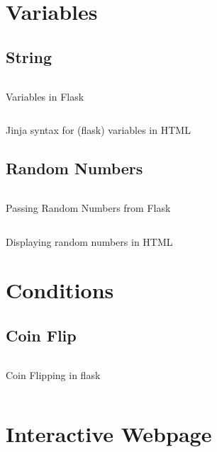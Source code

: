 \section{Variables}
\subsection{String}
\begin{code}
	\inputminted{python}{codes/web/flask/hello2/application.py}
	\caption{Variables in Flask}
\end{code}
\begin{code}
	\inputminted{html}{codes/web/flask/hello2/templates/index.html}
	\caption{Jinja syntax for (flask) variables in HTML}
\end{code}

\subsection{Random Numbers}
\begin{code}
	\inputminted{python}{codes/web/flask/random/application.py}
	\caption{Passing Random Numbers from Flask}
\end{code}
\clearpage
\begin{code}
	\inputminted{html}{codes/web/flask/random/templates/index.html}
	\caption{Displaying random numbers in HTML}
\end{code}

\section{Conditions}
\subsection{Coin Flip}
\begin{code}
	\inputminted{python}{codes/web/flask/coin/application.py}
	\caption{Coin Flipping in flask}
\end{code}
\clearpage
\begin{code}
	\inputminted{html}{codes/web/flask/coin/templates/index.html}
\end{code}

\section{Interactive Webpage}
